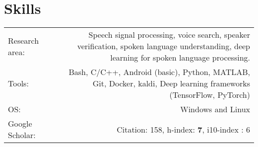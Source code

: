 \documentclass[10pt]{article}
\begin{document}
\section*{Skills}
\begin{tabular}{L!{\VRule}R}
	Research area: &Speech signal processing, voice search, speaker verification, spoken language understanding, deep learning for spoken language processing.\vspace{0.2cm}\\
	Tools:& Bash, C/C++, Android (basic), Python, MATLAB,  Git, Docker, kaldi, Deep learning frameworks (TensorFlow, PyTorch) \vspace{0.2cm}\\
	OS: & Windows and Linux \vspace{0.2cm}\\
	Google Scholar: & {Citation}: 158, {h-index}: \textbf{7}, {i10-index} : 6 %
\end{tabular}
\end{document}
